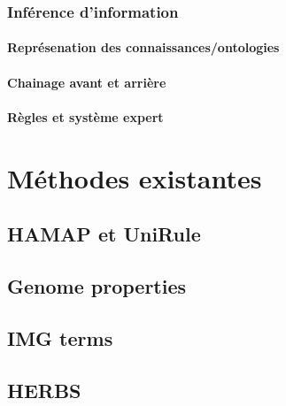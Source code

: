 \subsubsection{Inférence d’information}
\paragraph{Représenation des connaissances/ontologies}
\paragraph{Chainage avant et arrière} %
\paragraph{Règles et système expert}

\section{Méthodes existantes}
\subsection{HAMAP et UniRule}
\subsection{Genome properties}
\subsection{IMG terms}
\subsection{HERBS}
